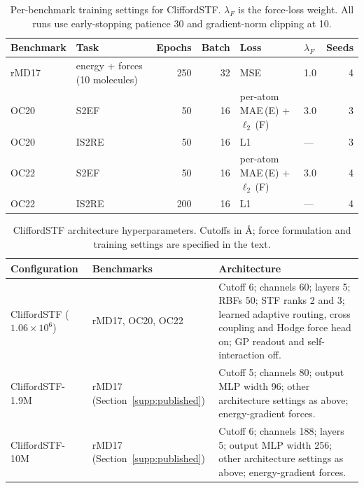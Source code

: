 \begin{table}[!htbp]
  \centering
  \small
  \caption{Per-benchmark training settings for CliffordSTF. $\lambda_F$ is the force-loss weight. All runs use early-stopping patience 30 and gradient-norm clipping at 10.}
  \label{tab:training-details}
  \begin{tabular}{llrrllr}
    \toprule
    Benchmark & Task & Epochs & Batch & Loss & $\lambda_F$ & Seeds \\
    \midrule
    rMD17 & energy + forces (10 molecules) & 250 & 32 & MSE & 1.0 & 4 \\
    OC20 & S2EF & 50 & 16 & per-atom MAE\,(E) $+$ $\ell_2$\,(F) & 3.0 & 3 \\
    OC20 & IS2RE & 50 & 16 & L1 & --- & 3 \\
    OC22 & S2EF & 50 & 16 & per-atom MAE\,(E) $+$ $\ell_2$\,(F) & 3.0 & 4 \\
    OC22 & IS2RE & 200 & 16 & L1 & --- & 4 \\
    \bottomrule
  \end{tabular}
\end{table}

\begin{table}[!htbp]
  \centering
  \small
  \caption{CliffordSTF architecture hyperparameters. Cutoffs in \AA{}; force formulation and training settings are specified in the text.}
  \label{tab:supp_settings}
  \setlength{\tabcolsep}{4pt}
  \renewcommand{\arraystretch}{1.15}
  \begin{tabular}{@{}p{}p{}p{}@{}}
    \toprule
    Configuration & Benchmarks & Architecture \\
    \midrule
    CliffordSTF ($1.06\times10^6$) & rMD17, OC20, OC22 & Cutoff 6; channels 60; layers 5; RBFs 50; STF ranks 2 and 3; learned adaptive routing, cross coupling and Hodge force head on; GP readout and self-interaction off. \\
    \addlinespace[3pt]
    CliffordSTF-1.9M & rMD17 (Section~\ref{supp:published}) & Cutoff 5; channels 80; output MLP width 96; other architecture settings as above; energy-gradient forces. \\
    \addlinespace[3pt]
    CliffordSTF-10M & rMD17 (Section~\ref{supp:published}) & Cutoff 6; channels 188; layers 5; output MLP width 256; other architecture settings as above; energy-gradient forces. \\
    \bottomrule
  \end{tabular}
\end{table}


